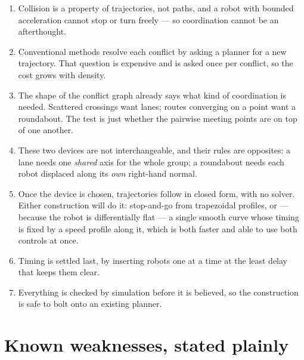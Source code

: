 \documentclass[11pt,a4paper]{article}
\begin{document}
\begin{enumerate}
\item Collision is a property of trajectories, not paths, and a robot with bounded
acceleration cannot stop or turn freely --- so coordination cannot be an afterthought.
\item Conventional methods resolve each conflict by asking a planner for a new trajectory.
That question is expensive and is asked once per conflict, so the cost grows with density.
\item The shape of the conflict graph already says what kind of coordination is needed.
Scattered crossings want lanes; routes converging on a point want a roundabout. The test is
just whether the pairwise meeting points are on top of one another.
\item These two devices are not interchangeable, and their rules are opposites: a lane needs
one \emph{shared} axis for the whole group; a roundabout needs each robot displaced along its
\emph{own} right-hand normal.
\item Once the device is chosen, trajectories follow in closed form, with no solver. Either
construction will do it: stop-and-go from trapezoidal profiles, or --- because the robot is
differentially flat --- a single smooth curve whose timing is fixed by a speed profile along
it, which is both faster and able to use both controls at once.
\item Timing is settled last, by inserting robots one at a time at the least delay that
keeps them clear.
\item Everything is checked by simulation before it is believed, so the construction is safe
to bolt onto an existing planner.
\end{enumerate}

\section*{Known weaknesses, stated plainly}
\end{document}
